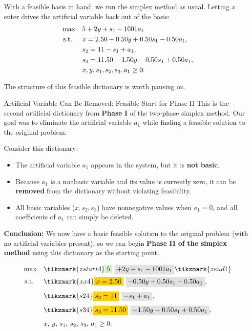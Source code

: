 With a feasible basis in hand, we run the simplex method as usual. Letting $x$ enter drives the artificial variable back out of the basis:
\[
\begin{aligned}
\max\quad & 5 + 2y + s_1 - 1001a_1 \\
\mbox{ s.t. }\quad & x = 2.50 - 0.50y + 0.50s_1 - 0.50a_1,\\
& s_2 = 11 - s_1 + a_1,\\
& s_3 = 11.50 - 1.50y - 0.50s_1 + 0.50a_1,\\
& x, y, s_1, s_2, s_3, a_1 \ge 0.
\end{aligned}
\]

\noindent The structure of this feasible dictionary is worth pausing on.
\begin{remark}{Artificial Variable Can Be Removed: Feasible Start for Phase II}{}
This is the second artificial dictionary from \textbf{Phase I} of the two-phase simplex method. Our goal was to eliminate the artificial variable \(a_1\) while finding a feasible solution to the original problem.

Consider this dictionary:
\begin{itemize}
    \item The artificial variable \(a_1\) appears in the system, but it is \textbf{not basic}.
    \item Because \(a_1\) is a nonbasic variable and its value is currently zero, it can be \textbf{removed} from the dictionary without violating feasibility.
    \item All basic variables (\(x, s_2, s_3\)) have nonnegative values when \(a_1 = 0\), and all coefficients of \(a_1\) can simply be deleted.
\end{itemize}

\textbf{Conclusion:} We now have a basic feasible solution to the original problem (with no artificial variables present), so we can begin \textbf{Phase II of the simplex method} using this dictionary as the starting point.

\vspace{1cm}

\[
\begin{aligned}
\max \quad 
& \tikzmark{zstart4} \text{\colorbox{green!20!white}{$5$}} ~ \text{\colorbox{gray!20!white}{$+ 2y + s_1 - 1001a_1$}} \tikzmark{zend4} \\
\st \quad 
& \tikzmark{xx4} \text{\colorbox{yellow}{$x = 2.50$}} ~ \text{\colorbox{gray!20!white}{$- 0.50y + 0.50s_1 - 0.50a_1$}},\\[1mm]
& \tikzmark{s24} \text{\colorbox{yellow}{$s_2 = 11$}} ~ \text{\colorbox{gray!20!white}{$- s_1 + a_1$}},\\[1mm]
& \tikzmark{s34} \text{\colorbox{yellow}{$s_3 = 11.50$}} ~ \text{\colorbox{gray!20!white}{$- 1.50y - 0.50s_1 + 0.50a_1$}},\\[1mm]
& x,\, y,\, s_1,\, s_2,\, s_3,\, a_1 \ge 0.
\end{aligned}
\]


\end{remark}
